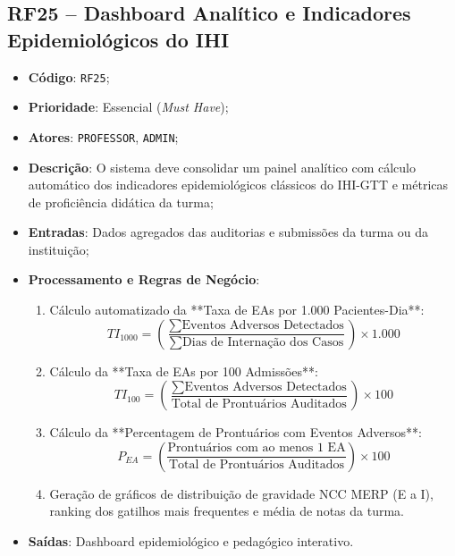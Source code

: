 \subsection{RF25 -- Dashboard Analítico e Indicadores Epidemiológicos do IHI}
\begin{itemize}
    \item \textbf{Código}: \texttt{RF25};
    \item \textbf{Prioridade}: Essencial (\textit{Must Have});
    \item \textbf{Atores}: \texttt{PROFESSOR}, \texttt{ADMIN};
    \item \textbf{Descrição}: O sistema deve consolidar um painel analítico com cálculo automático dos indicadores epidemiológicos clássicos do IHI-GTT e métricas de proficiência didática da turma;
    \item \textbf{Entradas}: Dados agregados das auditorias e submissões da turma ou da instituição;
    \item \textbf{Processamento e Regras de Negócio}:
    \begin{enumerate}
        \item Cálculo automatizado da **Taxa de EAs por 1.000 Pacientes-Dia**:
        \begin{equation}
            TI_{1000} = \left( \frac{\sum \text{Eventos Adversos Detectados}}{\sum \text{Dias de Internação dos Casos}} \right) \times 1.000
        \end{equation}
        \item Cálculo da **Taxa de EAs por 100 Admissões**:
        \begin{equation}
            TI_{100} = \left( \frac{\sum \text{Eventos Adversos Detectados}}{\text{Total de Prontuários Auditados}} \right) \times 100
        \end{equation}
        \item Cálculo da **Percentagem de Prontuários com Eventos Adversos**:
        \begin{equation}
            P_{EA} = \left( \frac{\text{Prontuários com ao menos 1 EA}}{\text{Total de Prontuários Auditados}} \right) \times 100
        \end{equation}
        \item Geração de gráficos de distribuição de gravidade NCC MERP (E a I), ranking dos gatilhos mais frequentes e média de notas da turma.
    \end{enumerate}
    \item \textbf{Saídas}: Dashboard epidemiológico e pedagógico interativo.
\end{itemize}

